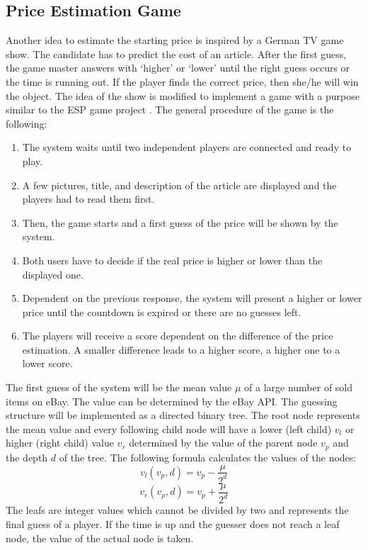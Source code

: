 \subsection{Price Estimation Game}
Another idea to estimate the starting price is inspired by a German TV game show. The candidate has to predict the cost of an article. After the first guess, the game master answers with `higher' or `lower' until the right guess occurs or the time is running out. If the player finds the correct price, then she/he will win the object.
The idea of the show is modified to implement a game with a purpose similar to the ESP game project \cite{esp}. The general procedure of the game is the following: 
\begin{enumerate}
	\item The system waits until two independent players are connected and ready to play. 
	\item A few pictures, title, and description of the article are displayed and the players had to read them first. 
	\item Then, the game starts and a first guess of the price will be shown by the system. 
	\item Both users have to decide if the real price is higher or lower than the displayed one. 
	\item Dependent on the previous response, the system will present a higher or lower price until the countdown is expired or there are no guesses left. 
	\item The players will receive a score dependent on the difference of the price estimation. A smaller difference leads to a higher score, a higher one to a lower score. 
\end{enumerate}
The first guess of the system will be the mean value \( \mu \) of a large number of sold items on eBay. The value can be determined by the eBay API. The guessing structure will be implemented as a directed binary tree. The root node represents the mean value and every following child node will have a lower (left child) \( v_l \) or higher (right child) value \( v_r \) determined by the value of the parent node \( v_p \) and the depth \( d \) of the tree. The following formula calculates the values of the nodes: 
\begin{equation}
v_l(v_p,d) = v_p - \frac{\mu}{2^d}
\end{equation}
\begin{equation}
v_r(v_p,d) = v_p + \frac{\mu}{2^d}
\end{equation}
The leafs are integer values which cannot be divided by two and represents the final guess of a player. If the time is up and the guesser does not reach a leaf node, the value of the actual node is taken. 
